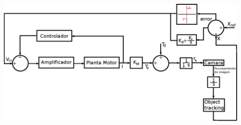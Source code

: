 \begin{center}
	\includegraphics[width=0.95\textwidth]{Contenido/Cuerpo/Capitulo5/Fig34.eps}
	\label{Fig4}
\end{center}
